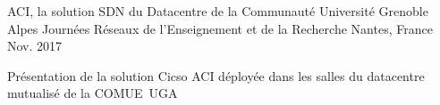 

\begin{cventries}

  \cventry
    {ACI, la solution SDN du Datacentre de la Communauté Université Grenoble Alpes} %
    {Journées Réseaux de l’Enseignement et de la Recherche} %
    {Nantes, France} %
    {Nov. 2017} %
    {
      \begin{cvitems} %
        \item {Présentation de la solution Cicso ACI déployée dans les salles du datacentre mutualisé de la COMUE UGA}
      \end{cvitems}
    }

\end{cventries}
